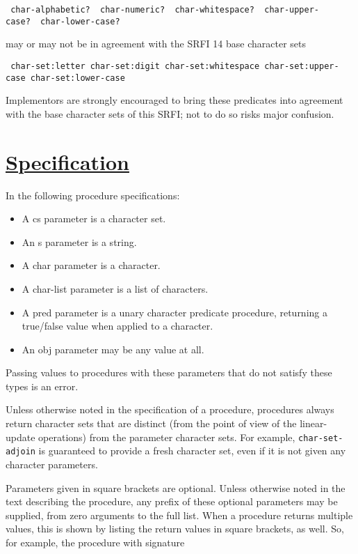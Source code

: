 \texttt{\ char-alphabetic?\ \ char-numeric?\ \ char-whitespace?\ \ char-upper-case?\ \ char-lower-case?\ }

may or may not be in agreement with the SRFI 14 base character sets

\texttt{\ char-set:letter\ char-set:digit\ char-set:whitespace\ char-set:upper-case\ char-set:lower-case}

Implementors are strongly encouraged to bring these predicates into
agreement with the base character sets of this SRFI; not to do so risks
major confusion.

\section{\texorpdfstring{\href{}{Specification}}{Specification}}\label{specification}

In the following procedure specifications:

\begin{itemize}
\tightlist
\item
  A cs parameter is a character set.
\item
  An s parameter is a string.
\item
  A char parameter is a character.
\item
  A char-list parameter is a list of characters.
\item
  A pred parameter is a unary character predicate procedure, returning a
  true/false value when applied to a character.
\item
  An obj parameter may be any value at all.
\end{itemize}

Passing values to procedures with these parameters that do not satisfy
these types is an error.

Unless otherwise noted in the specification of a procedure, procedures
always return character sets that are distinct (from the point of view
of the linear-update operations) from the parameter character sets. For
example, \texttt{char-set-adjoin} is guaranteed to provide a fresh
character set, even if it is not given any character parameters.

Parameters given in square brackets are optional. Unless otherwise noted
in the text describing the procedure, any prefix of these optional
parameters may be supplied, from zero arguments to the full list. When a
procedure returns multiple values, this is shown by listing the return
values in square brackets, as well. So, for example, the procedure with
signature

